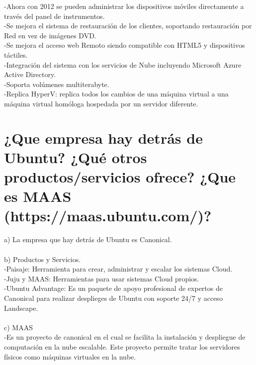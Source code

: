 -Ahora con 2012 se pueden administrar los dispositivos móviles directamente a través del panel de instrumentos.\\
-Se mejora el sistema de restauración de los clientes, soportando restauración por Red en vez de imágenes DVD.\\
-Se mejora el acceso web Remoto siendo compatible con HTML5 y dispositivos táctiles.\\
-Integración del sistema con los servicios de Nube incluyendo Microsoft Azure Active Directory.\\
-Soporta volúmenes multiterabyte.\\
-Replica HyperV: replica todos los cambios de una máquina virtual a una máquina virtual homóloga hospedada por un servidor diferente.\\
\clearpage
\section{¿Que empresa hay detrás de Ubuntu? ¿Qué otros productos/servicios ofrece? ¿Que es MAAS (https://maas.ubuntu.com/)? \cite{06p51} \cite{06p52}}

a) La empresa que hay detrás de Ubuntu es Canonical.\\\\
b) Productos y Servicios.\\
-Paisaje: Herramienta para crear, administrar y escalar los sistemas Cloud.\\
-Juju y MAAS: Herramientas para usar sistemas Cloud propios.\\
-Ubuntu Advantage: Es un paquete de apoyo profesional de expertos de Canonical para realizar desplieges de Ubuntu con soporte 24/7 y acceso Landscape.\\\\
c) MAAS\\
-Es un proyecto de canonical en el cual se facilita la instalación y despliegue de computación en la nube escalable. Este proyecto permite tratar los servidores físicos como máquinas virtuales en la nube.\\

